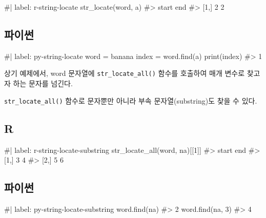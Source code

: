 \documentclass[
  letterpaper,
]{book}
\newenvironment{Shaded}{\begin{snugshade}}{\end{snugshade}}
\newcommand{\NormalTok}[1]{\textcolor[rgb]{0.00,0.23,0.31}{#1}}
\begin{document}
\begin{Shaded}
\begin{Highlighting}[]
\NormalTok{\#| label: r{-}string{-}locate}
\NormalTok{str\_locate(word, \textquotesingle{}a\textquotesingle{})}
\NormalTok{\#\textgreater{}      start end}
\NormalTok{\#\textgreater{} [1,]     2   2}
\end{Highlighting}
\end{Shaded}

\subsection{파이썬}

\begin{Shaded}
\begin{Highlighting}[]
\NormalTok{\#| label: py{-}string{-}locate}
\NormalTok{word = \textquotesingle{}banana\textquotesingle{}}
\NormalTok{index = word.find(\textquotesingle{}a\textquotesingle{})}
\NormalTok{print(index)}
\NormalTok{\#\textgreater{} 1}
\end{Highlighting}
\end{Shaded}

상기 예제에서, word 문자열에 \texttt{str\_locate\_all()} 함수를 호출하여
매개 변수로 찾고자 하는 문자를 넘긴다.

\texttt{str\_locate\_all()} 함수로 문자뿐만 아니라 부속
문자열(substring)도 찾을 수 있다.

\subsection{R}

\begin{Shaded}
\begin{Highlighting}[]
\NormalTok{\#| label: r{-}string{-}locate{-}substring}
\NormalTok{str\_locate\_all(word, \textquotesingle{}na\textquotesingle{})[[1]]}
\NormalTok{\#\textgreater{}      start end}
\NormalTok{\#\textgreater{} [1,]     3   4}
\NormalTok{\#\textgreater{} [2,]     5   6}
\end{Highlighting}
\end{Shaded}

\subsection{파이썬}

\begin{Shaded}
\begin{Highlighting}[]
\NormalTok{\#| label: py{-}string{-}locate{-}substring}
\NormalTok{word.find(\textquotesingle{}na\textquotesingle{})}
\NormalTok{\#\textgreater{} 2}
\NormalTok{word.find(\textquotesingle{}na\textquotesingle{}, 3)}
\NormalTok{\#\textgreater{} 4}
\end{Highlighting}
\end{Shaded}
\end{document}
